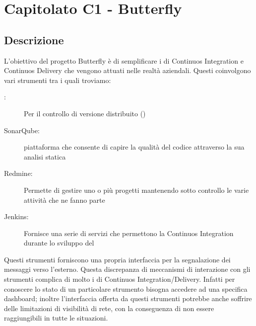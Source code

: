 \clearpage
\section{Capitolato C1 - Butterfly}
	\subsection{Descrizione}
	L'obiettivo del progetto Butterfly è di semplificare i  di Continuos Integration e Continuos Delivery che vengono attuati nelle realtà aziendali.
Questi  coinvolgono vari strumenti  tra i quali troviamo:
 	\begin{description}
 		\item[:] Per il controllo di versione distribuito ()
 		\item[SonarQube:] piattaforma che consente di capire la qualità del codice attraverso la sua analisi statica
 		\item[Redmine:] Permette di gestire uno o più progetti mantenendo sotto controllo le varie attività che ne fanno parte
 		\item[Jenkins:] Fornisce una serie di servizi che permettono la Continuos Integration durante lo sviluppo del 
 	\end{description}
 	
 	Questi strumenti forniscono una propria interfaccia per la segnalazione dei messaggi verso l'esterno. Questa discrepanza di meccanismi di interazione con gli strumenti
complica di molto i  di Continuos Integration/Delivery. Infatti per conoscere lo stato di un particolare strumento bisogna
accedere ad una specifica dashboard; inoltre l'interfaccia offerta da questi strumenti potrebbe anche soffrire
delle limitazioni di visibilità di rete, con la conseguenza di non essere raggiungibili in tutte le situazioni.

